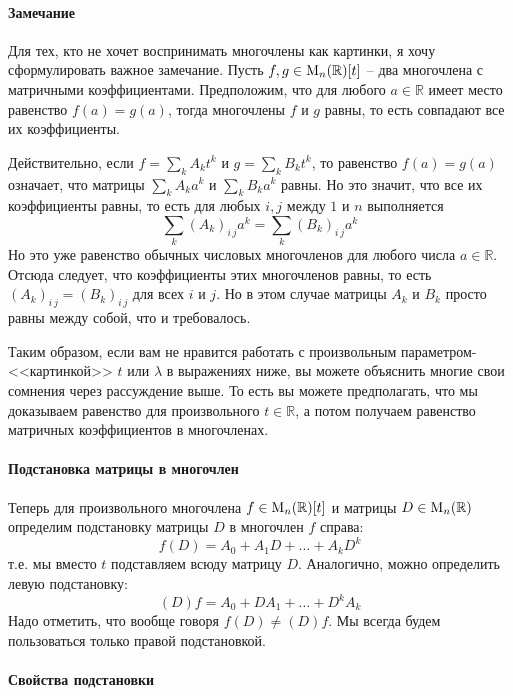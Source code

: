 \paragraph{Замечание}

Для тех, кто не хочет воспринимать многочлены как картинки, я хочу сформулировать важное замечание.
Пусть $f, g\in \operatorname{M}_{n}(\mathbb R)[t]$ -- два многочлена с матричными коэффициентами.
Предположим, что для любого $a\in\mathbb R$ имеет место равенство $f(a) = g(a)$, тогда многочлены $f$ и $g$ равны, то есть совпадают все их коэффициенты.

Действительно, если $f = \sum_k A_k t^k$ и $g = \sum_k B_k t^k$, то равенство $f(a) = g(a)$ означает, что матрицы $\sum_k A_k a^k$ и $\sum_k B_k a^k$ равны.
Но это значит, что все их коэффициенты равны, то есть для любых $i,j$ между $1$ и $n$ выполняется
\[
\sum_k (A_k)_{i\,j} a^k = \sum_k (B_k)_{i\,j} a^k
\]
Но это уже равенство обычных числовых многочленов для любого числа $a\in \mathbb R$.
Отсюда следует, что коэффициенты этих многочленов равны, то есть $(A_k)_{i\,j} = (B_k)_{i\,j}$ для всех $i$ и $j$.
Но в этом случае матрицы $A_k$ и $B_k$ просто равны между собой, что и требовалось.

Таким образом, если вам не нравится работать с произвольным параметром-<<картинкой>> $t$ или $\lambda$ в выражениях ниже, вы можете объяснить многие свои сомнения через рассуждение выше.
То есть вы можете предполагать, что мы доказываем равенство для произвольного $t\in \mathbb R$, а потом получаем равенство матричных коэффициентов в многочленах.

\paragraph{Подстановка матрицы в многочлен} 

Теперь для произвольного многочлена $f\in\operatorname{M}_{n}(\mathbb R)[t]$ и матрицы $D\in\operatorname{M}_{n}(\mathbb R)$ определим подстановку матрицы $D$ в многочлен $f$ справа:
\[
f(D) = A_0 + A_1 D + \ldots + A_k D^k
\]
т.е. мы вместо $t$ подставляем всюду матрицу $D$.
Аналогично, можно определить левую подстановку:
\[
(D)f = A_0 + D A_1 + \ldots + D^k A_k
\]
Надо отметить, что вообще говоря $f(D)\neq (D)f$.
Мы всегда будем пользоваться только правой подстановкой.

\paragraph{Свойства подстановки}

